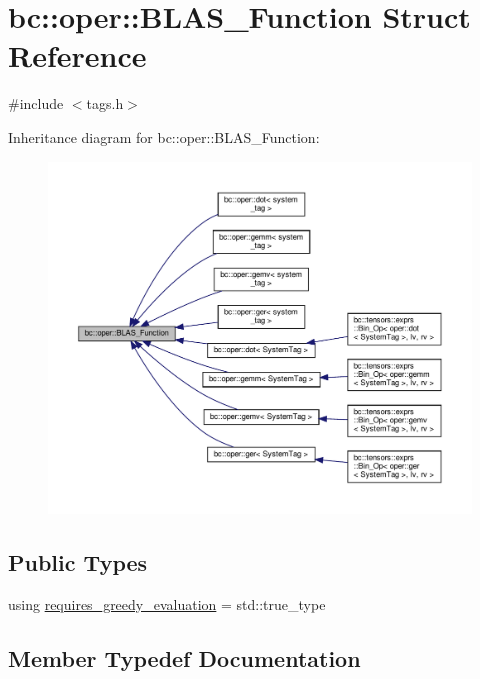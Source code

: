 \hypertarget{structbc_1_1oper_1_1BLAS__Function}{}\section{bc\+:\+:oper\+:\+:B\+L\+A\+S\+\_\+\+Function Struct Reference}
\label{structbc_1_1oper_1_1BLAS__Function}


{\ttfamily \#include $<$tags.\+h$>$}



Inheritance diagram for bc\+:\+:oper\+:\+:B\+L\+A\+S\+\_\+\+Function\+:\nopagebreak
\begin{figure}[H]
\begin{center}
\leavevmode
\includegraphics[width=350pt]{structbc_1_1oper_1_1BLAS__Function__inherit__graph}
\end{center}
\end{figure}
\subsection*{Public Types}
\begin{DoxyCompactItemize}
\item 
using \hyperlink{structbc_1_1oper_1_1BLAS__Function_ad4e5dabb543b1971a20884c4c1a68443}{requires\+\_\+greedy\+\_\+evaluation} = std\+::true\+\_\+type
\end{DoxyCompactItemize}


\subsection{Member Typedef Documentation}
\mbox{\label{structbc_1_1oper_1_1BLAS__Function_ad4e5dabb543b1971a20884c4c1a68443}} 
